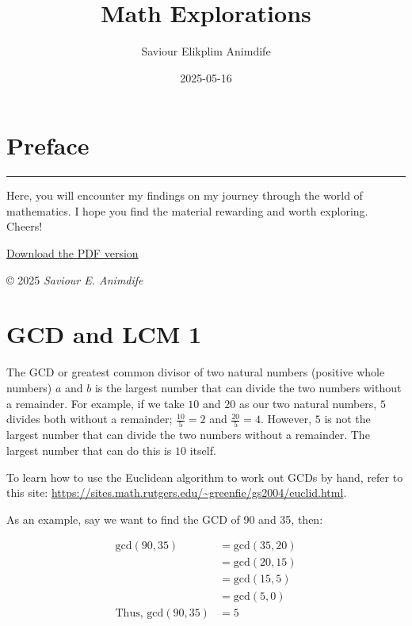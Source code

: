 \documentclass[
]{book}
\title{Math Explorations}
\author{Saviour Elikplim Animdife}
\date{2025-05-16}
\begin{document}
\maketitle

{
\setcounter{tocdepth}{1}
\tableofcontents
}
\chapter*{Preface}\label{preface}

\begin{center}\rule{0.5\linewidth}{0.5pt}\end{center}

Here, you will encounter my findings on my journey through the world of mathematics. I hope you find the material rewarding and worth exploring. Cheers!

\href{https://github.com/sneurocode/math-explorations/blob/master/docs/_main.pdf}{Download the PDF version}

© 2025 \emph{Saviour E. Animdife}

\chapter{GCD and LCM 1}\label{gcd-and-lcm-1}

The GCD or greatest common divisor of two natural numbers (positive whole numbers) \(a\) and \(b\) is the largest number that can divide the two numbers without a remainder. For example, if we take \(10\) and \(20\) as our two natural numbers, \(5\) divides both without a remainder; \(\frac{10}{5} = 2\) and \(\frac{20}{5} = 4\). However, \(5\) is not the largest number that can divide the two numbers without a remainder. The largest number that can do this is \(10\) itself.

To learn how to use the Euclidean algorithm to work out GCDs by hand, refer to this site: \url{https://sites.math.rutgers.edu/~greenfie/gs2004/euclid.html}.

As an example, say we want to find the GCD of 90 and 35, then:

\[
\begin{aligned}
\text{gcd}(90, 35) &= \text{gcd}(35, 20) \\
&= \text{gcd}(20, 15) \\
&= \text{gcd}(15, 5) \\
&= \text{gcd}(5, 0) \\
\text{Thus, gcd}(90, 35) &= 5
\end{aligned}
\]
\end{document}
